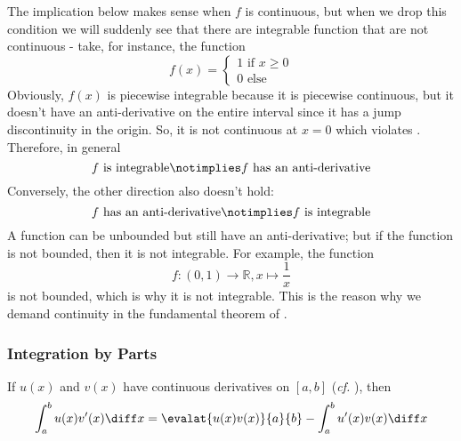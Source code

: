 \begin{rem}\label{rem-newton-leibniz-formula}
	The implication below makes sense when $f$ is continuous, but when we drop this
	condition we will suddenly see that there are integrable function that are not
	continuous - take, for instance, the function
	\begin{equation*}
		f(x) = \begin{cases}
			1\text{ if } x\geq0 \\
			0\text{ else }
		\end{cases}
	\end{equation*}
	Obviously, $f(x)$ is piecewise integrable because it is piecewise continuous,
	but it doesn't have an anti-derivative on the entire interval since it has a
	jump discontinuity in the origin. So, it is not continuous at $x=0$ which
	violates . Therefore, in general
	\begin{equation}\label{eq-rem-newton-leibniz-formula:ltr}
		\text{$f$ is integrable} \notimplies \text{$f$ has an anti-derivative}
	\end{equation}
	Conversely, the other direction also doesn't hold:
	\begin{equation}\label{eq-rem-newton-leibniz-formula:rtl}
		\text{$f$ has an anti-derivative} \notimplies \text{$f$ is integrable}
	\end{equation}
	A function can be unbounded but still have an anti-derivative; but if the
	function is not bounded, then it is not integrable. For example, the function
	\begin{equation*}
		f:(0,1)\to\mathbb{R},x\mapsto\frac{1}{x}
	\end{equation*}
	is not bounded, which is why it is not integrable. This is the reason why we
	demand continuity in the fundamental theorem of .
\end{rem}

\subsubsection{Integration by Parts}\label{subsubsec-integration-by-parts-definite-integrals}

\begin{thm}\label{thm-integration-by-parts-definite-integrals}
	If $u(x)$ and $v(x)$ have continuous derivatives on $[a,b]$ (\textit{cf.}
	), then
	\begin{equation}\label{eq-integration-by-parts-definite-integrals}
		\int_a^b u(x) v'(x) \diff x = \evalat{u(x)v(x)}{a}{b} - \int_a^b u'(x) v(x) \diff x
	\end{equation}
\end{thm}

